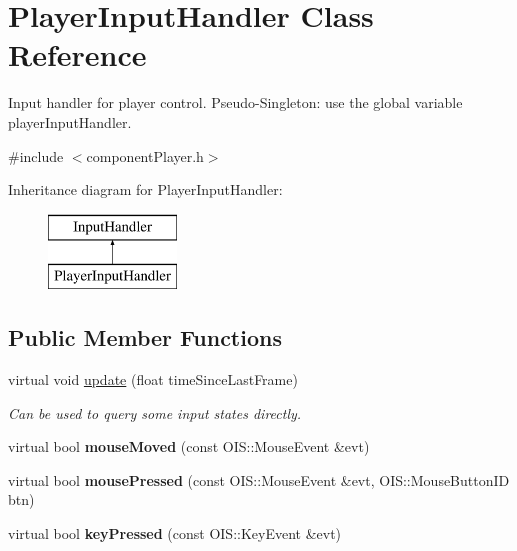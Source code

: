 \hypertarget{classPlayerInputHandler}{
\section{\-Player\-Input\-Handler \-Class \-Reference}
\label{db/d40/classPlayerInputHandler}
}


\-Input handler for player control. \-Pseudo-\/\-Singleton\-: use the global variable player\-Input\-Handler.  




{\ttfamily \#include $<$component\-Player.\-h$>$}

\-Inheritance diagram for \-Player\-Input\-Handler\-:\begin{figure}[H]
\begin{center}
\leavevmode
\includegraphics[height=2.000000cm]{db/d40/classPlayerInputHandler}
\end{center}
\end{figure}
\subsection*{\-Public \-Member \-Functions}
\begin{DoxyCompactItemize}
\item 
\hypertarget{classPlayerInputHandler_abc4095c729728dceeb68ae839d8e6db1}{
virtual void \hyperlink{classPlayerInputHandler_abc4095c729728dceeb68ae839d8e6db1}{update} (float time\-Since\-Last\-Frame)}
\label{db/d40/classPlayerInputHandler_abc4095c729728dceeb68ae839d8e6db1}

\begin{DoxyCompactList}\small\item\em \-Can be used to query some input states directly. \end{DoxyCompactList}\item 
\hypertarget{classPlayerInputHandler_a167344af0c00c75ffb694851b6642b01}{
virtual bool {\bfseries mouse\-Moved} (const \-O\-I\-S\-::\-Mouse\-Event \&evt)}
\label{db/d40/classPlayerInputHandler_a167344af0c00c75ffb694851b6642b01}

\item 
\hypertarget{classPlayerInputHandler_a7fe3974ac2a2fa1f6f55e842dda544e1}{
virtual bool {\bfseries mouse\-Pressed} (const \-O\-I\-S\-::\-Mouse\-Event \&evt, \-O\-I\-S\-::\-Mouse\-Button\-I\-D btn)}
\label{db/d40/classPlayerInputHandler_a7fe3974ac2a2fa1f6f55e842dda544e1}

\item 
\hypertarget{classPlayerInputHandler_a844e8461b7ee04d3397ff284650dc204}{
virtual bool {\bfseries key\-Pressed} (const \-O\-I\-S\-::\-Key\-Event \&evt)}
\label{db/d40/classPlayerInputHandler_a844e8461b7ee04d3397ff284650dc204}

\end{DoxyCompactItemize}
